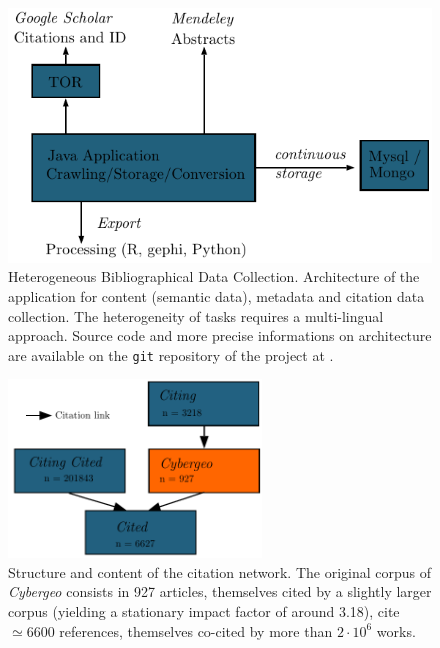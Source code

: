 \begin{figure}
\includegraphics[width=\textwidth]{figures/archi}
\caption[Heterogeneous Bibliographical Data Collection]{Heterogeneous Bibliographical Data Collection. Architecture of the application for content (semantic data), metadata and citation data collection. The heterogeneity of tasks requires a multi-lingual approach. Source code and more precise informations on architecture are available on the \texttt{git} repository of the project at \texttt{}.}
\label{fig:datacollection}
\end{figure}



\begin{figure}
\centering
\includegraphics[width=0.6\textwidth]{figures/citnw}
\caption{Structure and content of the citation network. The original corpus of \emph{Cybergeo} consists in 927 articles, themselves cited by a slightly larger corpus (yielding a stationary impact factor of around 3.18), cite $\simeq 6600$ references, themselves co-cited by more than $2\cdot 10^6$ works.}
\label{fig:citationnetwork}
\end{figure}









